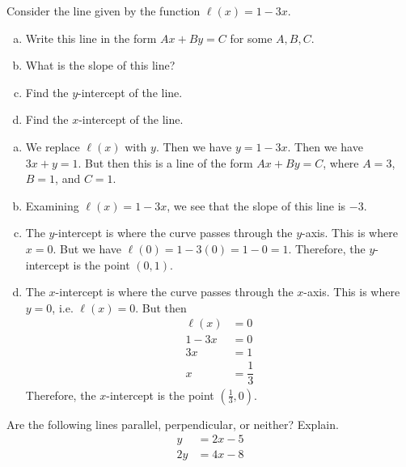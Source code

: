 \documentclass[11pt,letterpaper]{article}
\begin{document}
\newpage





 Consider the line given by the function $\ell(x)= 1 - 3x$.

\begin{enumerate}[(a)]
\item Write this line in the form $Ax + By= C$ for some $A, B, C$. 
\item What is the slope of this line?
\item Find the $y$-intercept of the line.
\item Find the $x$-intercept of the line. 
\end{enumerate} \pspace

\sol
\begin{enumerate}[(a)]
\item We replace $\ell(x)$ with $y$. Then we have $y= 1 - 3x$. Then we have $3x + y= 1$. But then this is a line of the form $Ax + By= C$, where $A= 3$, $B= 1$, and $C= 1$. 

\item Examining $\ell(x)= 1 - 3x$, we see that the slope of this line is $-3$. 

\item The $y$-intercept is where the curve passes through the $y$-axis. This is where $x= 0$. But we have $\ell(0)= 1 - 3(0)= 1 - 0= 1$. Therefore, the $y$-intercept is the point $(0, 1)$. 

\item The $x$-intercept is where the curve passes through the $x$-axis. This is where $y= 0$, i.e. $\ell(x)= 0$. But then
	\[
	\begin{aligned}
	\ell(x)&= 0 \\
	1 - 3x&= 0 \\
	3x&= 1 \\
	x&= \dfrac{1}{3}
	\end{aligned}
	\]
Therefore, the $x$-intercept is the point $(\frac{1}{3}, 0)$. 
\end{enumerate}





\newpage





 Are the following lines parallel, perpendicular, or neither? Explain.
	\[
	\begin{aligned}
	y&= 2x - 5 \\
	2y&= 4x - 8
	\end{aligned}
	\] \pspace
\end{document}
